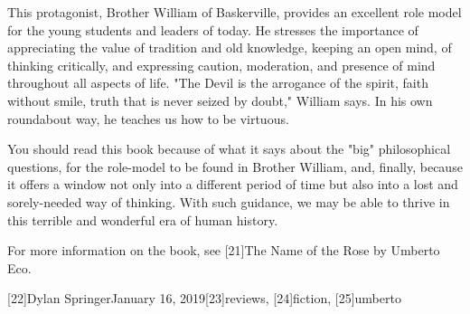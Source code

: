    This protagonist, Brother William of Baskerville, provides an excellent
   role model for the young students and leaders of today. He stresses the
   importance of appreciating the value of tradition and old knowledge,
   keeping an open mind, of thinking critically, and expressing caution,
   moderation, and presence of mind throughout all aspects of life. "The
   Devil is the arrogance of the spirit, faith without smile, truth that
   is never seized by doubt," William says. In his own roundabout way, he
   teaches us how to be virtuous.

   You should read this book because of what it says about the "big"
   philosophical questions, for the role-model to be found in Brother
   William, and, finally, because it offers a window not only into a
   different period of time but also into a lost and sorely-needed way of
   thinking. With such guidance, we may be able to thrive in this terrible
   and wonderful era of human history.

   For more information on the book, see [21]The Name of the Rose by
   Umberto Eco.

   [22]Dylan SpringerJanuary 16, 2019[23]reviews, [24]fiction, [25]umberto
